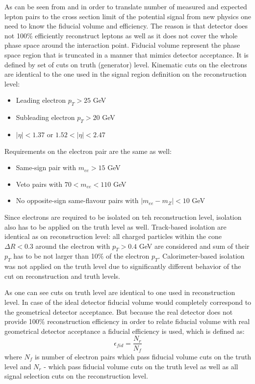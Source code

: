 As can be seen from  and  in order to translate number of measured and expected lepton pairs 
to the cross section limit of the potential signal from new physics one need to know the fiducial volume and efficiency.
The reason is that detector does not 100$\%$ efficiently reconstruct leptons as well as it does not cover the whole phase space around the interaction point.
Fiducial volume represent the phase space region that is truncated in a manner that mimics detector acceptance.
It is defined by set of cuts on truth (generator) level. 
Kinematic cuts on the electrons are identical to the one used in the signal region definition on the reconstruction level:
\begin{itemize}
 \item Leading electron $p_T > 25$ GeV
 \item Subleading electron $p_T > 20$ GeV
 \item $|\eta|<1.37$ or $1.52<|\eta|<2.47$
\end{itemize}
Requirements on the electron pair are the same as well:
\begin{itemize}
 \item Same-sign pair with $m_{ee} > 15$ GeV
 \item Veto pairs with $70 < m_{ee} < 110$ GeV
 \item No opposite-sign same-flavour pairs with $|m_{ee} - m_{Z}| < 10$ GeV
\end{itemize}
Since electrons are required to be isolated on teh reconstruction level, isolation also has to be applied on the truth level as well.
Track-based isolation are identical as on reconstruction level:
all charged particles within the cone $\Delta R < 0.3$ around the electron with $p_T > 0.4$ GeV are considered and
sum of their $p_T$ has to be not larger than 10$\%$ of the electron $p_T$.
Calorimeter-based isolation was not applied on the truth level due to significantly different behavior of the cut on reconstruction and truth levels.

As one can see cuts on truth level are identical to one used in reconstruction level.
In case of the ideal detector fiducial volume would completely correspond to the geometrical detector acceptance.
But because the real detector does not provide 100$\%$ reconstruction efficiency in order to relate fiducial volume with real geometrical detector acceptance
a fiducial efficiency is used, which is defined as:
\begin{equation}
 \epsilon_{fid} = \dfrac{N_r}{N_f}
\end{equation}
where $N_f$ is number of electron pairs which pass fiducial volume cuts on the truth level and $N_r$ - which pass fiducial volume cuts on the truth level 
as well as all signal selection cuts on the reconstruction level.

